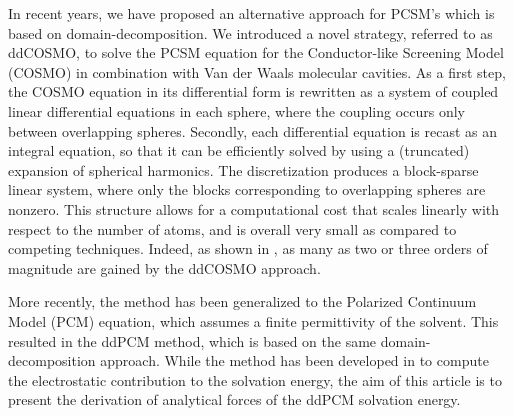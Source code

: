 In recent years, we have proposed an alternative approach for PCSM's which is based on  domain-decomposition. We introduced a novel strategy\cite{Cances_JCP_ddCOSMO}, referred to as ddCOSMO\cite{Cances_JCP_ddCOSMO,Lipparini_JCTC_ddCOSMO,Lipparini_JPCL_ddCOSMO,Lipparini_JCP_ddCOSMO-QM}, to solve the PCSM equation for the Conductor-like Screening Model\cite{Klamt_JCS_Cosmo} (COSMO) in combination with Van der Waals molecular cavities. 
As a first step, the COSMO equation in its differential form is rewritten as a system of coupled linear differential equations in each sphere, where the coupling occurs only between overlapping spheres. Secondly, each differential equation is recast as an integral equation, so that it can be efficiently solved by using a (truncated) expansion of spherical harmonics\cite{Cances_JCP_ddCOSMO}. The discretization produces a block-sparse linear system\cite{Lipparini_JCTC_ddCOSMO}, where only the blocks corresponding to overlapping spheres are nonzero. This structure allows for a computational cost that scales linearly with respect to the number of atoms, and is overall very small as compared to competing techniques. Indeed, as shown in \cite{Lipparini_JPCL_ddCOSMO}, as many as two or three orders of magnitude are gained by the ddCOSMO approach.

More recently, the method has been generalized to the Polarized Continuum Model (PCM) equation, which assumes a finite permittivity of the solvent. This resulted in the ddPCM method\cite{Stamm_JCP_DDPCM}, which is based on the same domain-decomposition approach. 
While the method has been developed in \cite{Stamm_JCP_DDPCM} to compute the electrostatic contribution to the solvation energy, the aim of this article is to present the derivation of analytical forces of the ddPCM solvation energy.

